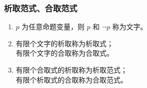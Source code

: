 \subsubsection{析取范式、合取范式}
\begin{enumerate}
	\item[\textbf{def1:}] $p$ 为任意命题变量，则 $p$ 和 $\neg p$ 称为文字。
	
	\item[\textbf{def2:}] 有限个文字的析取称为析取式；\\
	有限个文字的合取称为合取式。
	
	\item[\textbf{def3:}] 有限个合取式的析取称为析取范式；\\
	有限个析取式的合取称为合取范式。
\end{enumerate}

